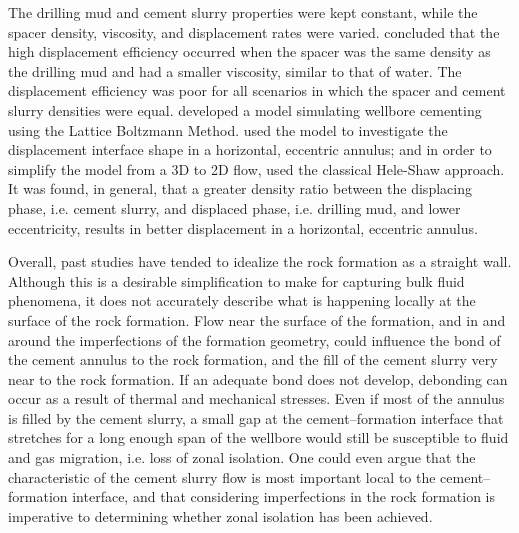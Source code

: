 \documentclass[pdftex,ms]{pittetd}
\begin{document}
The drilling mud and cement slurry properties were kept constant, while the spacer density, viscosity, and displacement rates were varied.
\citeauthor{Zul12} concluded that the high displacement efficiency occurred when the spacer was the same density as the drilling mud and had a smaller viscosity, similar to that of water.
The displacement efficiency was poor for all scenarios in which the spacer and cement slurry densities were equal.
\citet{zhao2016lattice} developed a model simulating wellbore cementing using the Lattice Boltzmann Method.
\citeauthor{zhao2016lattice} used the model to investigate the displacement interface shape in a horizontal, eccentric annulus; and in order to simplify the model from a 3D to 2D flow, used the classical Hele-Shaw approach.
It was found, in general, that a greater density ratio between the displacing phase, i.e. cement slurry, and displaced phase, i.e. drilling mud, and lower eccentricity, results in better displacement in a horizontal, eccentric annulus.


Overall, past studies have tended to idealize the rock formation as a straight wall.
Although this is a desirable simplification to make for capturing bulk fluid phenomena, it does not accurately describe what is happening locally at the surface of the rock formation.
Flow near the surface of the formation, and in and around the imperfections of the formation geometry, could influence the bond of the cement annulus to the rock formation, and the fill of the cement slurry very near to the rock formation.
If an adequate bond does not develop, debonding can occur as a result of thermal and mechanical stresses.
Even if most of the annulus is filled by the cement slurry, a small gap at the cement--formation interface that stretches for a long enough span of the wellbore would still be susceptible to fluid and gas migration, i.e. loss of zonal isolation.
One could even argue that the characteristic of the cement slurry flow is most important local to the cement--formation interface, and that considering imperfections in the rock formation is imperative to determining whether zonal isolation has been achieved.
\end{document}
